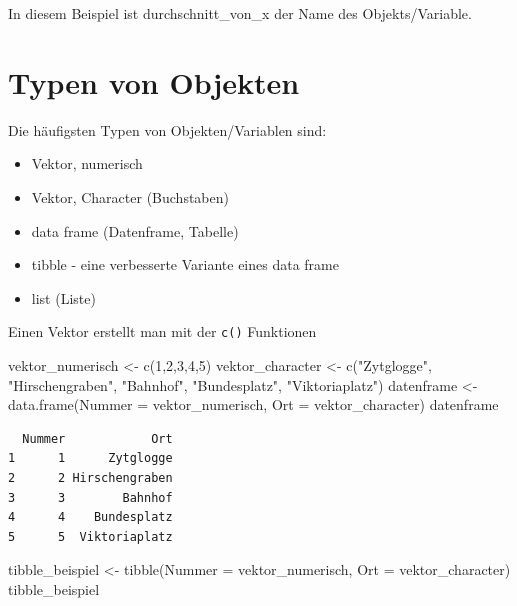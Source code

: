 \documentclass[
  letterpaper,
  DIV=11,
  numbers=noendperiod]{scrreprt}
\newenvironment{Shaded}{\begin{snugshade}}{\end{snugshade}}
\newcommand{\AttributeTok}[1]{\textcolor[rgb]{0.40,0.45,0.13}{#1}}
\newcommand{\DecValTok}[1]{\textcolor[rgb]{0.68,0.00,0.00}{#1}}
\newcommand{\FunctionTok}[1]{\textcolor[rgb]{0.28,0.35,0.67}{#1}}
\newcommand{\NormalTok}[1]{\textcolor[rgb]{0.00,0.23,0.31}{#1}}
\newcommand{\OtherTok}[1]{\textcolor[rgb]{0.00,0.23,0.31}{#1}}
\newcommand{\StringTok}[1]{\textcolor[rgb]{0.13,0.47,0.30}{#1}}
\providecommand{\tightlist}{%
  \setlength{\itemsep}{0pt}\setlength{\parskip}{0pt}}\usepackage{longtable,booktabs,array}
\begin{document}
In diesem Beispiel ist durchschnitt\_von\_x der Name des
Objekts/Variable.


\chapter{Typen von Objekten}\label{typen-von-objekten}

Die häufigsten Typen von Objekten/Variablen sind:

\begin{itemize}
\tightlist
\item
  Vektor, numerisch
\item
  Vektor, Character (Buchstaben)
\item
  data frame (Datenframe, Tabelle)
\item
  tibble - eine verbesserte Variante eines data frame
\item
  list (Liste)
\end{itemize}

Einen Vektor erstellt man mit der \texttt{c()} Funktionen

\begin{Shaded}
\begin{Highlighting}[]
\NormalTok{vektor\_numerisch }\OtherTok{\textless{}{-}} \FunctionTok{c}\NormalTok{(}\DecValTok{1}\NormalTok{,}\DecValTok{2}\NormalTok{,}\DecValTok{3}\NormalTok{,}\DecValTok{4}\NormalTok{,}\DecValTok{5}\NormalTok{)}
\NormalTok{vektor\_character }\OtherTok{\textless{}{-}} \FunctionTok{c}\NormalTok{(}\StringTok{"Zytglogge"}\NormalTok{, }\StringTok{"Hirschengraben"}\NormalTok{, }\StringTok{"Bahnhof"}\NormalTok{, }\StringTok{"Bundesplatz"}\NormalTok{, }\StringTok{"Viktoriaplatz"}\NormalTok{)}
\NormalTok{datenframe }\OtherTok{\textless{}{-}} \FunctionTok{data.frame}\NormalTok{(}\AttributeTok{Nummer =}\NormalTok{ vektor\_numerisch, }\AttributeTok{Ort =}\NormalTok{ vektor\_character)}
\NormalTok{datenframe}
\end{Highlighting}
\end{Shaded}

\begin{verbatim}
  Nummer            Ort
1      1      Zytglogge
2      2 Hirschengraben
3      3        Bahnhof
4      4    Bundesplatz
5      5  Viktoriaplatz
\end{verbatim}

\begin{Shaded}
\begin{Highlighting}[]
\NormalTok{tibble\_beispiel }\OtherTok{\textless{}{-}} \FunctionTok{tibble}\NormalTok{(}\AttributeTok{Nummer =}\NormalTok{ vektor\_numerisch, }\AttributeTok{Ort =}\NormalTok{ vektor\_character)}
\NormalTok{tibble\_beispiel}
\end{Highlighting}
\end{Shaded}
\end{document}
